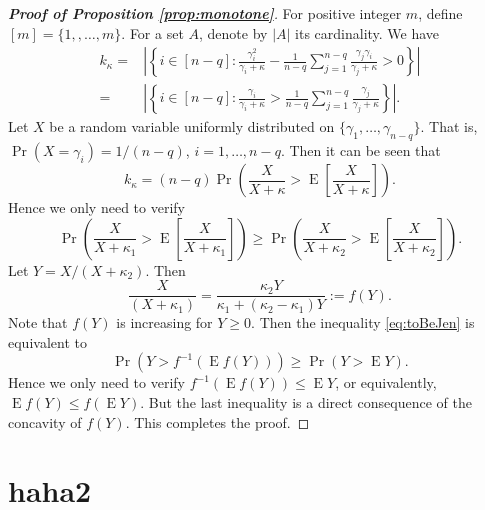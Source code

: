 \documentclass[11pt]{article}
\DeclareMathOperator{\myE}{E}
\theoremstyle{plain}
\theoremstyle{definition}
\theoremstyle{remark}
\begin{document}
\begin{appendices}
\begin{proof}[\textbf{Proof of Proposition \ref{prop:monotone}}]
    For positive integer $m$, define $[m]=\{1,,\ldots, m\}$.
    For a set $A$, denote by $| A |$ its cardinality.
    We have
    \begin{equation*}
        \begin{split}
        k_{\kappa} =& \left|\left\{i\in [n-q]: \frac{\gamma_i^2}{\gamma_i +\kappa} - \frac{1}{n-q} \sum_{j=1}^{n-q}\frac{\gamma_j \gamma_i}{\gamma_j +\kappa}>0 \right\}\right|
        \\
        =& \left|\left\{i\in [n-q]: \frac{\gamma_i}{\gamma_i +\kappa} > \frac{1}{n-q} \sum_{j=1}^{n-q}\frac{\gamma_j }{\gamma_j +\kappa} \right\}\right|
        .
        \end{split}
    \end{equation*}
    Let $X$ be a random variable uniformly distributed on $\{\gamma_1,\ldots,\gamma_{n-q}\}$.
    That is, $\Pr(X=\gamma_i)=1/(n-q)$, $i=1,\ldots, n-q$.
    Then it can be seen that
    \begin{equation*}
        k_{\kappa}=(n-q) \Pr \left(\frac{X}{X+\kappa}>\myE \left[\frac{X}{X+\kappa}\right]\right).
    \end{equation*}
    Hence we only need to verify
    \begin{equation}\label{eq:toBeJen}
        \Pr \left(\frac{X}{X+\kappa_1}>\myE \left[\frac{X}{X+\kappa_1}\right]\right) 
\geq
\Pr \left(\frac{X}{X+\kappa_2}>\myE \left[\frac{X}{X+\kappa_2}\right]\right) .
    \end{equation}
    Let $Y=X/(X+\kappa_2)$.
    Then
    \begin{equation*}
        \frac{X}{(X+\kappa_1)} = \frac{\kappa_2 Y}{ \kappa_1 + (\kappa_2-\kappa_1) Y} := f(Y).
    \end{equation*}
    Note that $f(Y)$ is increasing for $Y\geq 0$.
    Then the inequality \eqref{eq:toBeJen} is equivalent to
    \begin{equation*}
        \Pr \left(Y> f^{-1}\left(\myE f(Y)\right)\right) 
\geq
\Pr \left( Y >\myE Y\right) .
    \end{equation*}
    Hence we only need to verify
        $f^{-1}\left(\myE f(Y)\right)
        \leq
        \myE Y$, or equivalently, $\myE f(Y)
        \leq
        f(\myE Y)$.
        But the last inequality is a direct consequence of the concavity of $f(Y)$.
        This completes the proof.

\end{proof}


    \section{haha2}
\end{appendices}





\end{document}
